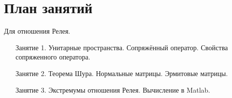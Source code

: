 \chapter{План занятий}

Для отношения Релея.
\begin{itemize}
    \item [Занятие 1.] Унитарные пространства. Сопряжённый оператор. Свойства сопряженного оператора.
    \item [Занятие 2.] Теорема Шура. Нормальные матрицы. Эрмитовые матрицы.
    \item [Занятие 3.] Экстремумы отношения Релея. Вычисление в Matlab.
\end{itemize}